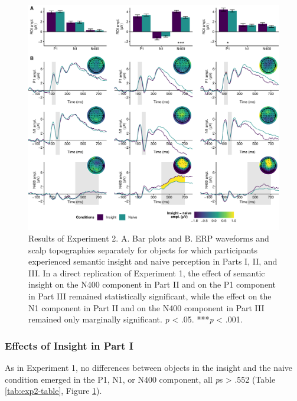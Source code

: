 \documentclass[
  english,
  man,11pt,floatsintext]{apa7}
\begin{document}
\begin{figure}

{\centering \includegraphics{manuscript_files/figure-latex/exp2-plot-1} 

}

\caption{Results of Experiment 2. A. Bar plots and B. ERP waveforms and scalp topographies separately for objects for which participants experienced semantic insight and naive perception in Parts I, II, and III. In a direct replication of Experiment 1, the effect of semantic insight on the N400 component in Part II and on the P1 component in Part III remained statistically significant, while the effect on the N1 component in Part II and on the N400 component in Part III remained only marginally significant. \newline*\emph{p} \textless{} .05. ***\emph{p} \textless{} .001.}\label{fig:exp2-plot}
\end{figure}

\hypertarget{effects-of-insight-in-part-i-1}{%
\subsubsection{Effects of Insight in Part I}\label{effects-of-insight-in-part-i-1}}

As in Experiment 1, no differences between objects in the insight and the naive condition emerged in the P1, N1, or N400 component, all \emph{p}s \textgreater{} .552 (Table \ref{tab:exp2-table}, Figure \ref{fig:exp2-plot}).
\end{document}
